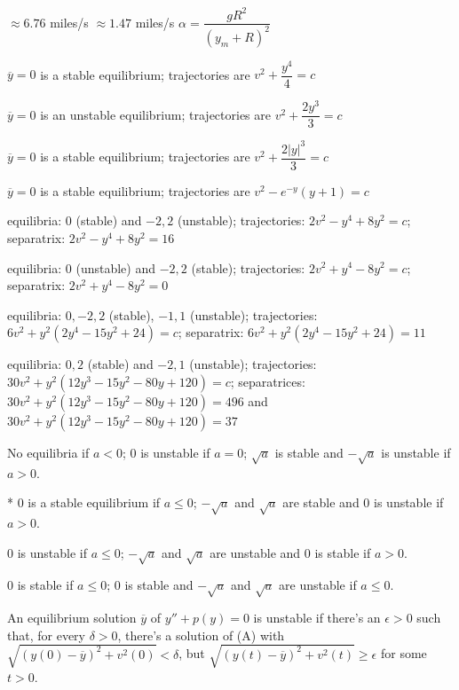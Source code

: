   $\approx 6.76$ miles/s
  $\approx 1.47$ miles/s
  $\alpha=\dfrac{gR^2}{(y_m+R)^2}$



$\overline y=0$ is a stable equilibrium;
 trajectories are $v^2+\dfrac{y^4}{4}=c$

$\overline y=0$ is an unstable equilibrium;
 trajectories are $v^2+\dfrac{2y^3}{3}=c$

$\overline y=0$ is a stable equilibrium;
 trajectories are $v^2+\dfrac{2|y|^3}{3}=c$

$\overline y=0$ is a stable equilibrium;
 trajectories are $v^2-e^{-y}(y+1)=c$

equilibria: $0$ (stable) and $-2,2$ (unstable);   trajectories:
$2v^2-y^4+8y^2=c$;
 separatrix: $2v^2-y^4+8y^2=16$

equilibria: $0$ (unstable) and $-2,2$ (stable);   trajectories:
$2v^2+y^4-8y^2=c$;
 separatrix: $2v^2+y^4-8y^2=0$

equilibria: $0,-2,2$ (stable), $-1,1$ (unstable);   trajectories:
$6v^2+y^2(2y^4-15y^2+24)=c$;   separatrix:
$6v^2+y^2(2y^4-15y^2+24)=11$

equilibria: $0,2$ (stable) and $-2,1$ (unstable);
 trajectories:
$30v^2+y^2(12y^3-15y^2-80y+120)=c$;
separatrices:
$30v^2+y^2(12y^3-15y^2-80y+120)=496$ and
$30v^2+y^2(12y^3-15y^2-80y+120)=37$

No equilibria if $a<0$;   $0$ is unstable if $a=0$;   $\sqrt a$ is stable
and
$-\sqrt{a}$ is unstable if $a>0$.

*
$0$ is a stable equilibrium if $a\le0$;
 $-\sqrt a$ and $\sqrt a$ are  stable  and $0$
is unstable if $a>0$.

$0$ is unstable if $a\le0$;   $-\sqrt a$ and $\sqrt a$ are unstable and
$0$ is stable if $a>0$.

$0$ is stable if $a\le0$;   $0$ is stable and $-\sqrt a$ and $\sqrt a$
are unstable if $a\le0$.

An equilibrium solution $\overline y$ of
$y''+p(y)=0$ is  unstable
if there's an $\epsilon>0$ such that, for every $\delta>0$,
there's a solution of (A) with
$\sqrt{(y(0)-\overline y)^2+v^2(0)}<\delta$, but
$\sqrt{(y(t)-\overline y)^2+v^2(t)}\ge\epsilon$ for some $t>0$.



